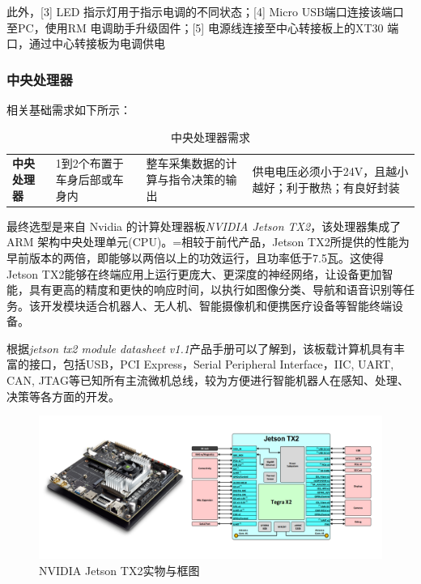 此外，[3] LED 指示灯用于指示电调的不同状态；[4] Micro USB端口连接该端口至PC，使用RM 电调助手升级固件；[5] 电源线连接至中心转接板上的XT30 端口，通过中心转接板为电调供电



\subsubsection{中央处理器}

相关基础需求如下所示：

\begin{table}[H]
	\centering%
	\caption[centering]{中央处理器需求}%
	\label{cpuxq}%
	\begin{tabular}{C{2cm}C{3cm}p{3cm}p{4cm}}	
		\toprule
		 & & &\\ 
		\midrule
		
		\textbf{中央处理器} & 1到2个布置于车身后部或车身内 & 整车采集数据的计算与指令决策的输出 & 供电电压必须小于24V，且越小越好；利于散热；有良好封装 \\
		
		\bottomrule
	\end{tabular}
\end{table}

最终选型是来自 Nvidia 的计算处理器板\emph{NVIDIA Jetson TX2}，该处理器集成了 ARM 架构中央处理单元(CPU)。=相较于前代产品，Jetson TX2所提供的性能为早前版本的两倍，即能够以两倍以上的功效运行，且功率低于7.5瓦。这使得Jetson TX2能够在终端应用上运行更庞大、更深度的神经网络，让设备更加智能，具有更高的精度和更快的响应时间，以执行如图像分类、导航和语音识别等任务。该开发模块适合机器人、无人机、智能摄像机和便携医疗设备等智能终端设备。

根据\emph{jetson tx2 module datasheet v1.1}产品手册可以了解到，该板载计算机具有丰富的接口，包括USB，PCI Express，Serial Peripheral Interface，IIC, UART, CAN, JTAG等已知所有主流微机总线，较为方便进行智能机器人在感知、处理、决策等各方面的开发。

\begin{figure}[H]
	\centering
	\includegraphics[width = 1\textwidth]{fig/tx_2.png}
	\caption{NVIDIA Jetson TX2实物与框图}
	\label{tx2}
\end{figure}

